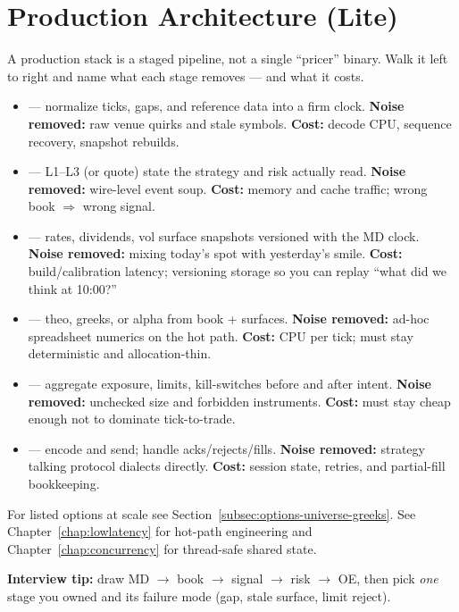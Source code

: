 \section{Production Architecture (Lite)}
\label{sec:pricer-risk-design}
A production stack is a staged pipeline, not a single ``pricer'' binary. Walk it left 
to right and name what each stage removes --- and what it costs.
\begin{itemize}
    \item {} --- normalize ticks, gaps, and reference data into 
          a firm clock. \textbf{Noise removed:} raw venue quirks and stale symbols. 
          \textbf{Cost:} decode CPU, sequence recovery, snapshot rebuilds.
    \item {} --- L1--L3 (or quote) state the strategy and risk 
          actually read. \textbf{Noise removed:} wire-level event soup. 
          \textbf{Cost:} memory and cache traffic; wrong book $\Rightarrow$ wrong signal.
    \item {} --- rates, dividends, vol surface snapshots 
          versioned with the MD clock. \textbf{Noise removed:} mixing today's spot with 
          yesterday's smile. \textbf{Cost:} build/calibration latency; versioning storage 
          so you can replay ``what did we think at 10:00?''
    \item {} --- theo, greeks, or alpha from book + surfaces. 
          \textbf{Noise removed:} ad-hoc spreadsheet numerics on the hot path. 
          \textbf{Cost:} CPU per tick; must stay deterministic and allocation-thin.
    \item {} --- aggregate exposure, limits, kill-switches before and 
          after intent. \textbf{Noise removed:} unchecked size and forbidden instruments. 
          \textbf{Cost:} must stay cheap enough not to dominate tick-to-trade.
    \item {} --- encode and send; handle acks/rejects/fills. 
          \textbf{Noise removed:} strategy talking protocol dialects directly. 
          \textbf{Cost:} session state, retries, and partial-fill bookkeeping.
\end{itemize}
For listed options at scale see Section~\ref{subsec:options-universe-greeks}. See 
Chapter~\ref{chap:lowlatency} for hot-path engineering and Chapter~\ref{chap:concurrency} 
for thread-safe shared state.
\par\noindent\textbf{Interview tip:} draw MD $\to$ book $\to$ signal $\to$ risk $\to$ OE, 
then pick \emph{one} stage you owned and its failure mode (gap, stale surface, limit reject).

